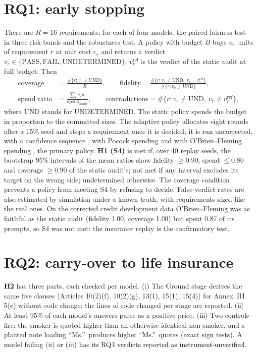 \section{RQ1: early stopping}
\label{sec:rq1}
There are $R=16$ requirements: for each of four models, the paired fairness test in three risk bands and the robustness test. A policy with budget $B$ buys $n_r$ units of requirement $r$ at unit cost $c_r$ and returns a verdict $v_r\in\{\text{PASS},\text{FAIL},\text{UNDETERMINED}\}$; $v^{\mathrm{ref}}_r$ is the verdict of the static audit at full budget. Then
\begin{align}
\text{coverage} &= \frac{\#\{r: v_r\neq\text{UND}\}}{R}, \qquad
\text{fidelity} = \frac{\#\{r: v_r\neq\text{UND},\ v_r=v^{\mathrm{ref}}_r\}}{\#\{r: v_r\neq\text{UND}\}},\\
\text{spend ratio} &= \frac{\sum_r c_r n_r}{\text{spend}_{\text{static}}}, \qquad
\text{contradictions} = \#\{r: v_r\neq\text{UND},\ v_r\ne v^{\mathrm{ref}}_r\},
\end{align}
where UND stands for UNDETERMINED.
The static policy spends the budget in proportion to the committed sizes. The adaptive policy allocates eight rounds after a 15\% seed and stops a requirement once it is decided; it is run uncorrected, with a confidence sequence \citep{howard}, with Pocock spending \citep{pocock1977} and with O'Brien--Fleming spending \citep{obrien1979,landemets}, the primary policy. \textbf{H1 (S4)} is met if, over 40 replay seeds, the bootstrap 95\% intervals of the mean ratios show fidelity $\ge0.90$, spend $\le0.80$ and coverage $\ge0.90$ of the static audit's; not met if any interval excludes its target on the wrong side; undetermined otherwise. The coverage condition prevents a policy from meeting S4 by refusing to decide. False-verdict rates are also estimated by simulation under a known truth, with requirements sized like the real ones. On the corrected credit development data O'Brien--Fleming was as faithful as the static audit (fidelity 1.00, coverage 1.00) but spent 0.87 of its prompts, so S4 was not met; the insurance replay is the confirmatory test.

\section{RQ2: carry-over to life insurance}
\label{sec:rq2}
\textbf{H2} has three parts, each checked per model. (i) The Ground stage derives the same five clauses (Articles 10(2)(f), 10(2)(g), 13(1), 15(1), 15(4)) for Annex~III 5(c) without code change; the lines of code changed per stage are reported. (ii) At least 95\% of each model's answers parse as a positive price. (iii) Two controls fire: the smoker is quoted higher than an otherwise identical non-smoker, and a planted note loading ``Ms.''\ produces higher ``Ms.''\ quotes (exact sign tests). A model failing (ii) or (iii) has its RQ3 verdicts reported as instrument-unverified.

